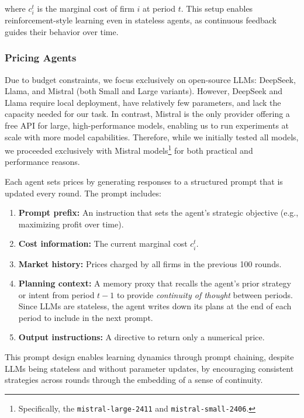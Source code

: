 where $c_i^t$ is the marginal cost of firm $i$ at period $t$. This setup enables reinforcement-style learning even in stateless agents, as continuous feedback guides their behavior over time.

\subsubsection*{Pricing Agents}

Due to budget constraints, we focus exclusively on open-source LLMs: DeepSeek, Llama, and Mistral (both Small and Large variants). However, DeepSeek and Llama require local deployment, have relatively few parameters, and lack the capacity needed for our task. In contrast, Mistral is the only provider offering a free API for large, high-performance models, enabling us to run experiments at scale with more model capabilities. Therefore, while we initially tested all models, we proceeded exclusively with Mistral models\footnote{Specifically, the \texttt{mistral-large-2411} and \texttt{mistral-small-2406}.} for both practical and performance reasons.

Each agent sets prices by generating responses to a structured prompt that is updated every round. The prompt includes:
\begin{enumerate}[noitemsep]
    \item \textbf{Prompt prefix:} An instruction that sets the agent's strategic objective (e.g., maximizing profit over time).
    \item \textbf{Cost information:} The current marginal cost $c_i^t$.
    \item \textbf{Market history:} Prices charged by all firms in the previous 100 rounds.
    \item \textbf{Planning context:} A memory proxy that recalls the agent's prior strategy or intent from period $t-1$ to provide \emph{continuity of thought} between periods. Since LLMs are stateless, the agent writes down its plans at the end of each period to include in the next prompt.
    \item \textbf{Output instructions:} A directive to return only a numerical price.
\end{enumerate}

This prompt design enables learning dynamics through prompt chaining, despite LLMs being stateless and without parameter updates, by encouraging consistent strategies across rounds through the embedding of a sense of continuity.

